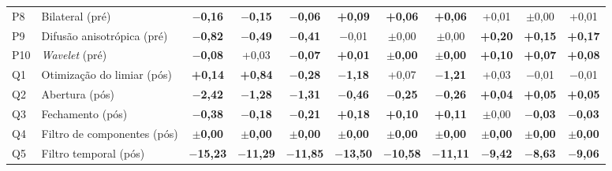 \begin{table}[t]
\begin{tabularx}{\textwidth}{L{0.6cm} Y *{9}{c}}
P8 & Bilateral (pré) & \textbf{$-$0,16} & \textbf{$-$0,15} & \textbf{$-$0,06} & \textbf{+0,09} & \textbf{+0,06} & \textbf{+0,06} & +0,01 & $\pm$0,00 & +0,01 \\
P9 & Difusão anisotrópica (pré) & \textbf{$-$0,82} & \textbf{$-$0,49} & \textbf{$-$0,41} & $-$0,01 & $\pm$0,00 & $\pm$0,00 & \textbf{+0,20} & \textbf{+0,15} & \textbf{+0,17} \\
P10 & \textit{Wavelet} (pré) & \textbf{$-$0,08} & +0,03 & \textbf{$-$0,07} & \textbf{+0,01} & \textbf{$\pm$0,00} & \textbf{$\pm$0,00} & \textbf{+0,10} & \textbf{+0,07} & \textbf{+0,08} \\
\midrule
Q1 & Otimização do limiar (pós) & \textbf{+0,14} & \textbf{+0,84} & \textbf{$-$0,28} & \textbf{$-$1,18} & +0,07 & \textbf{$-$1,21} & +0,03 & $-$0,01 & $-$0,01 \\
Q2 & Abertura (pós) & \textbf{$-$2,42} & \textbf{$-$1,28} & \textbf{$-$1,31} & \textbf{$-$0,46} & \textbf{$-$0,25} & \textbf{$-$0,26} & \textbf{+0,04} & \textbf{+0,05} & \textbf{+0,05} \\
Q3 & Fechamento (pós) & \textbf{$-$0,38} & \textbf{$-$0,18} & \textbf{$-$0,21} & \textbf{+0,18} & \textbf{+0,10} & \textbf{+0,11} & $\pm$0,00 & \textbf{$-$0,03} & \textbf{$-$0,03} \\
Q4 & Filtro de componentes (pós) & \textbf{$\pm$0,00} & \textbf{$\pm$0,00} & \textbf{$\pm$0,00} & \textbf{$\pm$0,00} & \textbf{$\pm$0,00} & \textbf{$\pm$0,00} & \textbf{$\pm$0,00} & \textbf{$\pm$0,00} & \textbf{$\pm$0,00} \\
Q5 & Filtro temporal (pós) & \textbf{$-$15,23} & \textbf{$-$11,29} & \textbf{$-$11,85} & \textbf{$-$13,50} & \textbf{$-$10,58} & \textbf{$-$11,11} & \textbf{$-$9,42} & \textbf{$-$8,63} & \textbf{$-$9,06} \\
\bottomrule
\end{tabularx}
\end{table}
